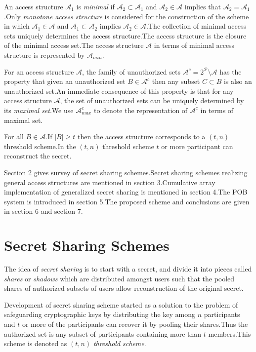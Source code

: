 \documentclass{llncs}
\begin{document}
An access structure $\mathcal{A}_1$ is \textit{minimal} if $\mathcal{A}_2 \subset \mathcal{A}_1$ and $\mathcal{A}_2 \in \mathcal{A}$ implies that $\mathcal{A}_2=\mathcal{A}_1$.Only \textit{monotone access structure} is considered for the construction of the scheme in which $\mathcal{A}_1 \in \mathcal{A}$ and $\mathcal{A}_1 \subset \mathcal{A}_2$ implies $\mathcal{A}_2 \in \mathcal{A}$.The collection of minimal access sets uniquely determines the access structure.The access structure is the closure of the minimal access set.The access structure $\mathcal{A}$ in terms of minimal access structure is represented by $\mathcal{A}_{min}$.

For an access structure $\mathcal{A}$, the family of unauthorized sets $\mathcal{A}^c=2^\mathcal{P} \setminus \mathcal{A}$ has the property that given an unauthorized set $B \in \mathcal{A}^c$ then any subset $C \subset B$ is also an unauthorized set.An immediate consequence of this property is that for any access structure $\mathcal{A}$, the set of unauthorized sets can be uniquely determined by its \textit{maximal set}.We use $\mathcal{A}^c_{max}$ to denote the representation of $\mathcal{A}^c$ in terms of maximal set.

For all $B \in \mathcal{A}$.If $|B| \ge t$ then the access structure corresponds to  a $(t,n)$ threshold scheme.In the $(t,n)$ threshold scheme $t$ or more participant can reconstruct the secret.

Section 2 gives survey of secret sharing schemes.Secret sharing schemes realizing general access structures are mentioned
in section 3.Cumulative array implementation of generalized secret sharing is mentioned in section 4.The POB system is introduced in section 5.The proposed scheme and conclusions are given in section 6 and section 7.
\section{Secret Sharing Schemes}
The idea of \textit{ secret sharing} is to start with a secret, and divide it into pieces called \textit{shares} or \textit{shadows} which are distributed amongst users such that the pooled shares of authorized subsets of users allow reconstruction of the original secret.

Development of secret sharing scheme started as a solution to the problem of safeguarding cryptographic keys by distributing the key among $n$ participants and $t$ or more of the participants can recover it by pooling their shares.Thus the authorized set is any subset of participants containing more than $t$ members.This scheme is denoted as $(t,n)$ \textit{threshold scheme}.
\end{document}

